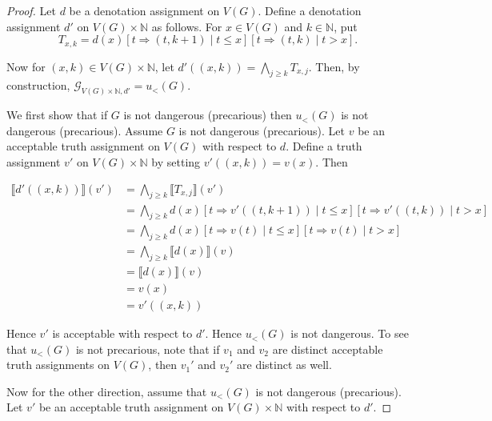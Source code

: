 \documentclass[12pt]{article}
\theoremstyle{remark}
\newcommand{\fancy}[1]{\mathcal{#1}}
\def\G{\fancy{G}}
\begin{document}
\begin{proof}
Let $d$ be a denotation assignment on $V(G)$.  Define a denotation assignment $d'$ on $V(G) \times \mathbb{N}$ as follows. For $x \in V(G)$ and $k \in \mathbb{N}$, put 
\[T_{x, k} = d(x)\left[t \Rightarrow (t, k + 1) \mid t \leq x\right]\left[t \Rightarrow (t, k) \mid t > x\right].\]

Now for $(x, k) \in V(G) \times \mathbb{N}$, let $d'((x,k)) = \bigwedge_{j \geq k} T_{x, j}$. Then, by construction, $\G_{V(G) \times \mathbb{N}, d'} = u_{<}(G)$.\newline

We first show that if $G$ is not dangerous (precarious) then $u_{<}(G)$ is not dangerous (precarious). Assume $G$ is not dangerous (precarious). Let $v$ be an acceptable truth assignment on $V(G)$ with respect to $d$.  Define a truth assignment $v'$ on $V(G) \times \mathbb{N}$ by setting $v'((x, k)) = v(x)$.  Then

\begin{align*}
\llbracket d'((x,k)) \rrbracket (v') &= \bigwedge_{j \geq k}  \llbracket T_{x, j} \rrbracket (v') \\
&=  \bigwedge_{j \geq k} d(x)\left[t \Rightarrow v'((t, k + 1)) \mid t \leq x \right]\left[t \Rightarrow v'((t, k))\mid t > x\right] \\
&=  \bigwedge_{j \geq k} d(x)\left[t \Rightarrow v(t) \mid t \leq x \right]\left[t \Rightarrow v(t)\mid t > x\right] \\
&= \bigwedge_{j \geq k} \llbracket d(x) \rrbracket(v) \\
&=  \llbracket d(x) \rrbracket(v) \\
&= v(x) \\
& = v'((x, k))
\end{align*}

Hence $v'$ is acceptable with respect to $d'$.   Hence $u_{<}(G)$ is not dangerous. To see that $u_{<}(G)$ is not precarious, note that if $v_1$ and $v_2$ are distinct acceptable truth assignments on $V(G)$, then $v_1'$ and $v_2'$ are distinct as well.\newline

Now for the other direction, assume that $u_{<}(G)$ is not dangerous (precarious). Let $v'$ be an acceptable truth assignment on $V(G) \times \mathbb{N}$ with respect to $d'$.\newline


\end{proof}
\end{document}

